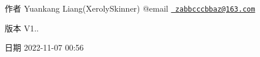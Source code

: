 \begin{DoxyAuthor}{作者}
Yuankang Liang(\+Xeroly\+Skinner) @email \href{mailto:zabbcccbbaz@163.com}{\texttt{ zabbcccbbaz@163.\+com}} 
\end{DoxyAuthor}
\begin{DoxyVersion}{版本}
V1.. 
\end{DoxyVersion}
\begin{DoxyDate}{日期}
2022-\/11-\/07 00\+:56 
\end{DoxyDate}
